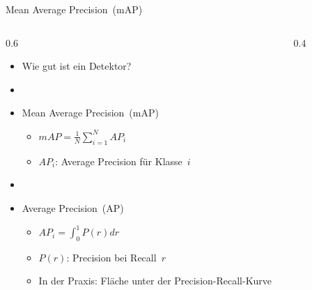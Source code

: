 \documentclass{beamer}
\begin{document}
\begin{frame}{Mean Average Precision~(mAP)}
  \begin{columns}
    \begin{column}{0.6\textwidth}
      \begin{itemize}
        \item Wie gut ist ein Detektor?\\\cite{Everingham2010VOC,Lin2014COCO}
        \item[]
        \item<2-> Mean Average Precision~(mAP)
          \begin{itemize}
            \item \(mAP = \frac{1}{N} \sum_{i=1}^{N} AP_i\)
            \item \(AP_i\): Average Precision für Klasse~\(i\)
          \end{itemize}
        \item<2->[]
        \item<3-> Average Precision~(AP)
          \begin{itemize}
            \item \(AP_i = \int_0^1 P(r) dr\)
            \item \(P(r)\): Precision bei Recall~\(r\)
            \item In der Praxis: Fläche unter der Precision-Recall-Kurve
          \end{itemize}
      \end{itemize}
    \end{column}
    \begin{column}{0.4\textwidth}
      \begin{figure}
        \centering
      \end{figure}
    \end{column}
  \end{columns}
\end{frame}
\end{document}
